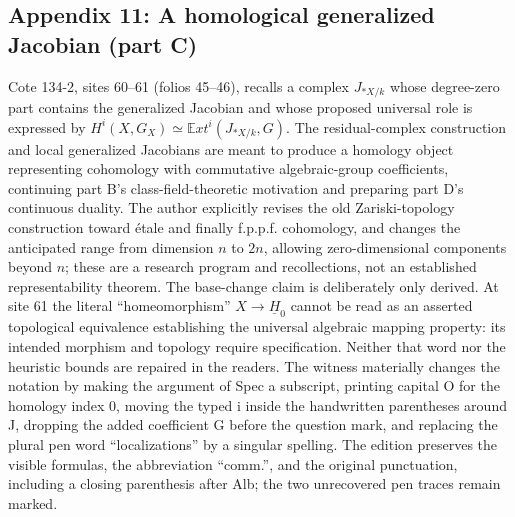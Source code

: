 \documentclass[10pt,oneside]{book}
\begin{document}
\subsection*{Appendix 11: A homological generalized Jacobian (part C)}
Cote 134-2, sites 60--61 (folios 45--46), recalls a complex $J_{*X/k}$ whose degree-zero part contains the generalized Jacobian and whose proposed universal role is expressed by $H^i(X,G_X)\simeq\mathbb E xt^i(J_{*X/k},G)$. The residual-complex construction and local generalized Jacobians are meant to produce a homology object representing cohomology with commutative algebraic-group coefficients, continuing part B's class-field-theoretic motivation and preparing part D's continuous duality. The author explicitly revises the old Zariski-topology construction toward étale and finally f.p.p.f. cohomology, and changes the anticipated range from dimension $n$ to $2n$, allowing zero-dimensional components beyond $n$; these are a research program and recollections, not an established representability theorem. The base-change claim is deliberately only derived. At site 61 the literal ``homeomorphism'' $X\to\underline H_0$ cannot be read as an asserted topological equivalence establishing the universal algebraic mapping property: its intended morphism and topology require specification. Neither that word nor the heuristic bounds are repaired in the readers. The witness materially changes the notation by making the argument of Spec a subscript, printing capital O for the homology index 0, moving the typed i inside the handwritten parentheses around J, dropping the added coefficient G before the question mark, and replacing the plural pen word ``localizations'' by a singular spelling. The edition preserves the visible formulas, the abbreviation ``comm.'', and the original punctuation, including a closing parenthesis after Alb; the two unrecovered pen traces remain marked.
\end{document}
